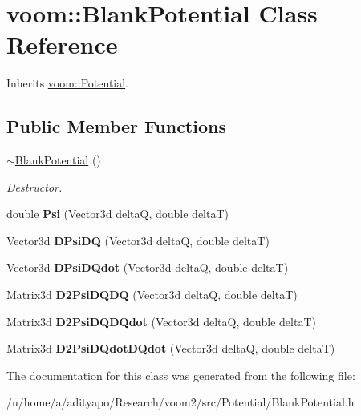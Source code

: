 \hypertarget{classvoom_1_1_blank_potential}{
\section{voom::BlankPotential Class Reference}
\label{classvoom_1_1_blank_potential}
}


Inherits \hyperlink{classvoom_1_1_potential}{voom::Potential}.\subsection*{Public Member Functions}
\begin{DoxyCompactItemize}
\item 
\hypertarget{classvoom_1_1_blank_potential_a751654100a3cb50ffe1909beb3a3bda8}{
\hyperlink{classvoom_1_1_blank_potential_a751654100a3cb50ffe1909beb3a3bda8}{$\sim$BlankPotential} ()}
\label{classvoom_1_1_blank_potential_a751654100a3cb50ffe1909beb3a3bda8}

\begin{DoxyCompactList}\small\item\em Destructor. \item\end{DoxyCompactList}\item 
\hypertarget{classvoom_1_1_blank_potential_a36249cf0ec81043b3d0bacb3e8f9b2ba}{
double {\bfseries Psi} (Vector3d deltaQ, double deltaT)}
\label{classvoom_1_1_blank_potential_a36249cf0ec81043b3d0bacb3e8f9b2ba}

\item 
\hypertarget{classvoom_1_1_blank_potential_aac7229746453aa2d681f8c2db6ddd5b1}{
Vector3d {\bfseries DPsiDQ} (Vector3d deltaQ, double deltaT)}
\label{classvoom_1_1_blank_potential_aac7229746453aa2d681f8c2db6ddd5b1}

\item 
\hypertarget{classvoom_1_1_blank_potential_ae379f2938db8c5e2e4cd0a1d9945fab0}{
Vector3d {\bfseries DPsiDQdot} (Vector3d deltaQ, double deltaT)}
\label{classvoom_1_1_blank_potential_ae379f2938db8c5e2e4cd0a1d9945fab0}

\item 
\hypertarget{classvoom_1_1_blank_potential_aaca367894c45f75273027a43969b9ef9}{
Matrix3d {\bfseries D2PsiDQDQ} (Vector3d deltaQ, double deltaT)}
\label{classvoom_1_1_blank_potential_aaca367894c45f75273027a43969b9ef9}

\item 
\hypertarget{classvoom_1_1_blank_potential_a71f7f8f5ab8aa8e5c0b1d32264204c97}{
Matrix3d {\bfseries D2PsiDQDQdot} (Vector3d deltaQ, double deltaT)}
\label{classvoom_1_1_blank_potential_a71f7f8f5ab8aa8e5c0b1d32264204c97}

\item 
\hypertarget{classvoom_1_1_blank_potential_a2e277bfcf2a3880e61e4cee7714a6c7a}{
Matrix3d {\bfseries D2PsiDQdotDQdot} (Vector3d deltaQ, double deltaT)}
\label{classvoom_1_1_blank_potential_a2e277bfcf2a3880e61e4cee7714a6c7a}

\end{DoxyCompactItemize}


The documentation for this class was generated from the following file:\begin{DoxyCompactItemize}
\item 
/u/home/a/adityapo/Research/voom2/src/Potential/BlankPotential.h\end{DoxyCompactItemize}
